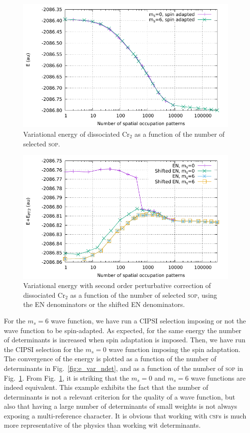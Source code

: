 \documentclass[aip,jcp,reprint,showkeys]{revtex4-1}
\newcommand{\sop}{\textsc{sop}}
\newcommand{\csf}{\textsc{csf}}
\begin{document}
\begin{figure}
\includegraphics[width=0.9\columnwidth]{e_var_nsop}
\caption{Variational energy of dissociated Cr$_2$ as a function of the number of
selected \sop{}.}
\label{fig:e_var_nsop}
\end{figure}

\begin{figure}
\includegraphics[width=0.9\columnwidth]{e_pt2_nsop}
\caption{Variational energy with second order perturbative correction of
dissociated Cr$_2$ as a function of the number of selected \sop{}, using
the EN denominators or the shifted EN denominators.}
\label{fig:e_pt2_nsop}
\end{figure}

For the $m_s=6$ wave function, we have run a CIPSI selection imposing or not the
wave function to be spin-adapted. As expected, for the same energy the number of
determinants is increased when spin adaptation is imposed. Then, we have run the
CIPSI selection for the $m_s=0$ wave function imposing the
spin adaptation. The convergence of the energy is plotted as a function of the
number of determinants in Fig.~\ref{fig:e_var_ndet}, and as a function of
the number of \sop{} in Fig.~\ref{fig:e_var_nsop}.
From Fig.~\ref{fig:e_var_nsop}, it is striking that the $m_s=0$ and $m_s=6$
wave functions are indeed equivalent. This example exhibits the fact that the
number of determinants is not a relevant criterion for the quality of a wave
function, but also that having a large number of determinants of small weights
is not always exposing a multi-reference character. It is obvious that 
working with \csf s is much more representative of the physics than working
wit determinants.
\end{document}
